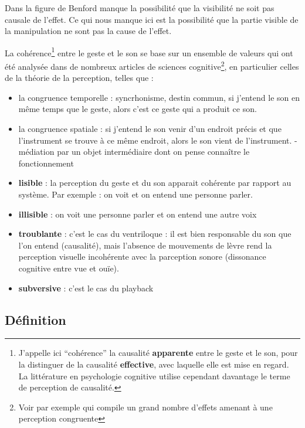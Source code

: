 Dans la figure de Benford manque la possibilité que la visibilité ne soit pas causale de l'effet.
Ce qui nous manque ici est la possibilité que la partie visible de la manipulation ne sont pas la cause de l'effet.

La cohérence\footnote{J'appelle ici ``cohérence'' la causalité \textbf{apparente} entre le geste et le son, pour la distinguer de la causalité \textbf{effective}, avec laquelle elle est mise en regard. La littérature en psychologie cognitive utilise cependant davantage le terme de perception de causalité.} entre le geste et le son se base sur un ensemble de valeurs qui ont été analysée dans de nombreux articles de sciences cognitive\footnote{Voir par exemple \cite{michotte_perception_2017} qui compile un grand nombre d'effets amenant à une perception congruente}, en particulier celles de la théorie de la perception, telles que :
\vspace{-1em}
\begin{itemize}[noitemsep]
	\item la congruence temporelle : syncrhonisme, destin commun, si j'entend le son en même temps que le geste, alors c'est ce geste qui a produit ce son.
	\item la congruence spatiale : si j'entend le son venir d'un endroit précis et que l'instrument se trouve à ce même endroit, alors le son vient de l'instrument.
- médiation par un objet intermédiaire dont on pense connaître le fonctionnement
\end{itemize}


\vspace{-1em}
\begin{itemize}[noitemsep]
	\item \textbf{lisible} : la perception du geste et du son apparait cohérente par rapport au système. Par exemple : on voit et on entend une personne parler.
	\item \textbf{illisible} : on voit une personne parler et on entend une autre voix
	\item \textbf{troublante} : c'est le cas du ventriloque : il est bien responsable du son que l'on entend (causalité), mais l'absence de mouvements de lèvre rend la perception visuelle incohérente avec la parception sonore (dissonance cognitive entre vue et ouïe).
	\item \textbf{subversive} : c'est le cas du playback
\end{itemize}

\subsection{Définition} 


